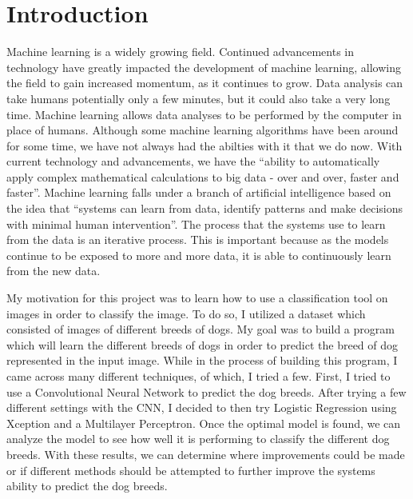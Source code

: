 \documentclass[12pt]{article}
\begin{document}
\section{Introduction}
\quad Machine learning is a widely growing field.  Continued advancements in technology have greatly impacted the development of machine learning, allowing the field to gain increased momentum, as it continues to grow.  Data analysis can take humans potentially only a few minutes, but it could also take a very long time.  Machine learning allows data analyses to be performed by the computer in place of humans.  Although some machine learning algorithms have been around for some time, we have not always had the abilties with it that we do now.  With current technology and advancements, we have the ``ability to automatically apply complex mathematical calculations to big data - over and over, faster and faster''\cite{SAS}.  Machine learning falls under a branch of artificial intelligence based on the idea that ``systems can learn from data, identify patterns and make decisions with minimal human intervention''\cite{SAS}.  The process that the systems use to learn from the data is an iterative process.  This is important because as the models continue to be exposed to more and more data, it is able to continuously learn from the new data.

My motivation for this project was to learn how to use a classification tool on images in order to classify the image.  To do so, I utilized a dataset which consisted of images of different breeds of dogs.  My goal was to build a program which will learn the different breeds of dogs in order to predict the breed of dog represented in the input image.  While in the process of building this program, I came across many different techniques, of which, I tried a few.  First, I tried to use a Convolutional Neural Network to predict the dog breeds.  After trying a few different settings with the CNN, I decided to then try Logistic Regression using Xception and a Multilayer Perceptron.  Once the optimal model is found, we can analyze the model to see how well it is performing to classify the different dog breeds.  With these results, we can determine where improvements could be made or if different methods should be attempted to further improve the systems ability to predict the dog breeds.
\end{document}
